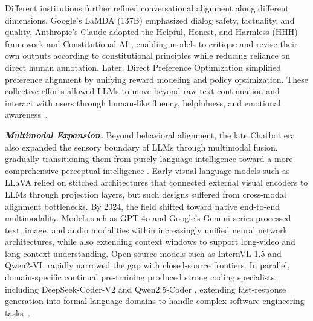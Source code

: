 Different institutions further refined conversational alignment along different dimensions. Google's LaMDA (137B) \cite{thoppilan2022lamda} emphasized dialog safety, factuality, and quality. Anthropic's Claude adopted the Helpful, Honest, and Harmless (HHH) framework \cite{bai2022training} and Constitutional AI \cite{bai2022constitutional}, enabling models to critique and revise their own outputs according to constitutional principles while reducing reliance on direct human annotation. Later, Direct Preference Optimization \cite{rafailov2023direct} simplified preference alignment by unifying reward modeling and policy optimization. These collective efforts allowed LLMs to move beyond raw text continuation and interact with users through human-like fluency, helpfulness, and emotional awareness~\citep{wang2025think,khalifa2026reasoning,lin2025plan,li2026test,liu2025efficient,qin-etal-2023-cross,du2024llms}.

\textbf{\textit{Multimodal Expansion.}} Beyond behavioral alignment, the late Chatbot era also expanded the sensory boundary of LLMs through multimodal fusion, gradually transitioning them from purely language intelligence toward a more comprehensive perceptual intelligence \cite{kuang2025natural,li2024towards,kuang2025express,liu2026tangrampuzzle,wan2025wanopenadvancedlargescale,dong2024modality}. Early visual-language models such as LLaVA \cite{liu2023llava} relied on stitched architectures that connected external visual encoders to LLMs through projection layers, but such designs suffered from cross-modal alignment bottlenecks. By 2024, the field shifted toward native end-to-end multimodality. Models such as GPT-4o \cite{hurst2024gpt} and Google's Gemini series \cite{gemini2023} processed text, image, and audio modalities within increasingly unified neural network architectures, while also extending context windows to support long-video and long-context understanding. Open-source models such as InternVL 1.5 \cite{chen2024far} and Qwen2-VL \cite{wang2024qwen2vl} rapidly narrowed the gap with closed-source frontiers. In parallel, domain-specific continual pre-training produced strong coding specialists, including DeepSeek-Coder-V2 \cite{deepseek2024coderv2} and Qwen2.5-Coder \cite{qwen2024qwen25coder}, extending fast-response generation into formal language domains to handle complex software engineering tasks~\citep{liu2025safe,luo2024improve,wang2026survey,zhang2025lessons,luo2026unlocking,zeng2025janusvln,gemmateam2025gemma3technicalreport}.

